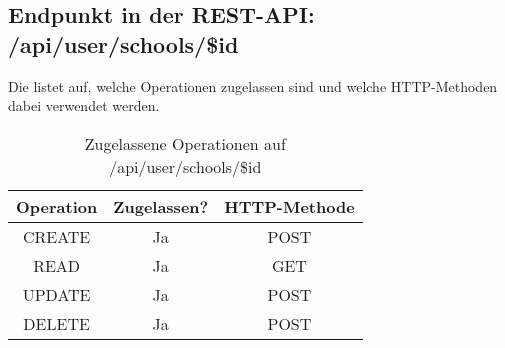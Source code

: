 \subsection{Endpunkt in der REST-API: /api/user/schools/\$id}
Die  listet auf, welche Operationen zugelassen sind und welche HTTP-Methoden dabei verwendet werden. 

\begin{table}[!htbp]
	\begin{tabular}{|c|c|c|}
		\hline
			\textbf{Operation} & \textbf{Zugelassen?} & \textbf{HTTP-Methode} \\ \hline
			CREATE & Ja & POST \\ \hline 
			READ & Ja & GET \\ \hline
			UPDATE & Ja & POST \\ \hline 
			DELETE & Ja & POST \\ \hline
	\end{tabular}

		\caption{Zugelassene Operationen auf /api/user/schools/\$id}
		\label{tab:end:rest:api:user:schools:id:meth}
\end{table}